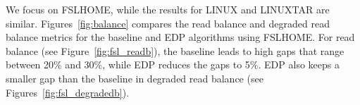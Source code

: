 



We focus on FSLHOME, while the results for LINUX and LINUXTAR
are similar.  Figures~\ref{fig:balance} compares the read balance and
degraded read balance metrics for the baseline and EDP algorithms using
FSLHOME.  For read balance (see Figure~\ref{fig:fsl_readb}), the baseline
leads to high gaps that range between 20\% and 30\%, while EDP reduces the
gaps to 5\%.  EDP also keeps a smaller gap than the baseline in degraded read
balance (see Figures~\ref{fig:fsl_degradedb}). 


